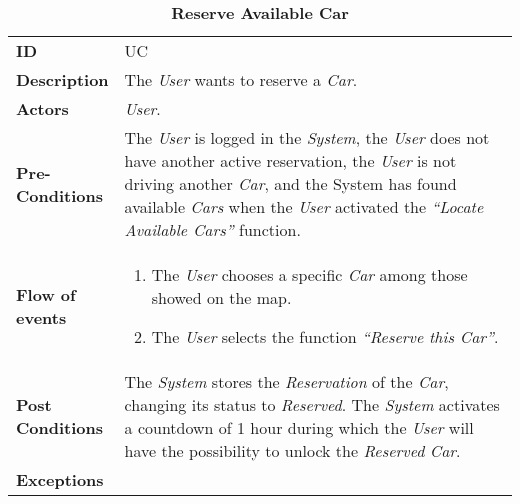 \begin{longtable}{|p{0.2\linewidth} p{0.8\linewidth}|}
	\captionsetup{labelformat=empty} %
	\caption{\textbf{Reserve Available Car}} %
	\label{UC_ReserveCar}%
	\\ \hline %
	
	\textbf{ID} & UC\theUseCaseIdCounter \\ \hline
	\textbf{Description} & The \emph{User} wants to reserve a \emph{Car}. \\ \hline
	\textbf{Actors} & \emph{User}.\\ \hline
	\textbf{Pre-Conditions} & The \emph{User} is logged in the \emph{System}, the \emph{User} does not have another active reservation, the \emph{User} is not driving another \emph{Car}, and the System has found available \emph{Cars} when the \emph{User} activated the \textit{\textquotedblleft{Locate Available Cars}\textquotedblright} function. \\ \hline
	\textbf{Flow of events} & 
	\begin{enumerate}
		\item The \emph{User} chooses a specific \emph{Car} among those showed on the map.
		\item The \emph{User} selects the function \textit{\textquotedblleft{Reserve this Car}\textquotedblright}.
	\end{enumerate}	 \\ \hline
	\textbf{Post Conditions} & The \emph{System} stores the \emph{Reservation} of the \emph{Car}, changing its status to \emph{Reserved}.
The \emph{System} activates a countdown of 1 hour during which the \emph{User} will have the possibility to unlock the \emph{Reserved} \emph{Car}. \\ \hline
	\textbf{Exceptions} & \\ \hline
\end{longtable}


